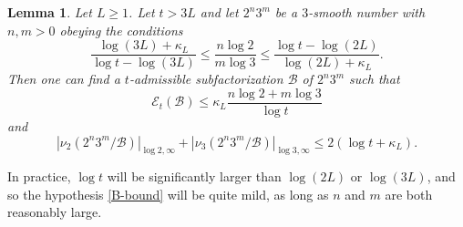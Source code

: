 \documentclass[12pt,a4paper,reqno]{amsart}
\numberwithin{equation}{section}
\theoremstyle{plain}
\newtheorem{lemma}[theorem]{Lemma}
\theoremstyle{definition}
\newcommand\tuple{{\mathcal B}}
\newcommand\excess{{\mathcal{E}}}
\begin{document}
\begin{lemma}\label{bound23}  Let $L \geq 1$.  Let $t > 3L$ and let $2^n 3^m$ be a $3$-smooth number with $n,m > 0$ obeying the conditions
  \begin{equation}\label{B-bound}
  \frac{\log(3L)+\kappa_L}{\log t - \log(3L)} \leq \frac{n \log 2}{m \log 3} \leq \frac{\log t - \log(2L)}{\log(2L)+\kappa_L}.
  \end{equation}
  Then one can find a $t$-admissible subfactorization $\tuple$ of $2^n 3^m$ such that
  \begin{equation}\label{excess-bound} 
    \excess_t(\tuple) \leq \kappa_L \frac{n \log 2 + m \log 3}{\log t} 
  \end{equation}
  and
  \begin{equation}\label{surplus-bound} 
    |\nu_2(2^n 3^m/\tuple)|_{\log 2,\infty} + |\nu_3(2^n 3^m/\tuple)|_{\log 3,\infty}  \leq 2(\log t + \kappa_L).
  \end{equation}
  \end{lemma}
  
  In practice, $\log t$ will be significantly larger than $\log(2L)$ or $\log(3L)$, and so the hypothesis \eqref{B-bound} will be quite mild, as long as $n$ and $m$ are both reasonably large.
  
\end{document}
